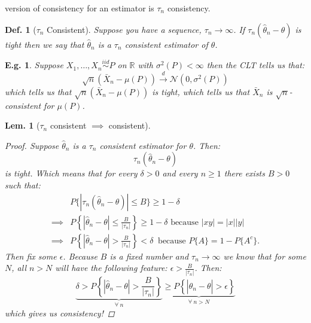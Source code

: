 \documentclass{tufte-book}
\theoremstyle{mytheoremstyle}
\theoremstyle{mylemstyle}
\newtheorem*{lem}{Lem.}
\theoremstyle{mydefstyle}
\newtheorem*{mydef}{Def.}
\newtheorem*{ex}{E.g.}
\begin{document}
 version of consistency for an estimator is \(\tau_n\) consistency.
\begin{mydef}[\(\tau_n\) Consistent] Suppose you have a sequence, \(\tau_n \rightarrow \infty\). If \(\tau_n(\hat{\theta}_n - \theta)\) is tight then we say that \(\hat{\theta}_n\) is a \(\tau_n\) consistent estimator of \(\theta\). 
\end{mydef}

\begin{ex} Suppose \(X_1, \dots, X_n \overset{iid}{\sim} P\) on \(\mathbb{R}\) with \(\sigma^2(P) < \infty\) then the CLT tells us that:
	\[\sqrt{n} (\bar{X}_n - \mu(P)) \overset{d}{\rightarrow} \mathcal{N}(0, \sigma^2(P))\]
which tells us that \(\sqrt{n} (\bar{X}_n - \mu(P)) \) is tight, which tells us that \(\bar{X}_n\) is \(\sqrt{n}\)-consistent for \(\mu(P)\). 
\end{ex}

\begin{lem}[\(\tau_n\) consistent \(\implies\) consistent] 
\begin{proof}Suppose \(\hat{\theta}_n\) is a \(\tau_n\) consistent estimator for \(\theta\). Then:
	\[\tau_n(\hat{\theta}_n - \theta)\]
is tight. Which means that for every \(\delta > 0\) and every \(n \ge 1\) there exists \(B > 0\) such that:
	\begin{align*}
		& P\{|\tau_n(\hat{\theta}_n - \theta)| \le B\} \ge 1- \delta \\
		\implies & P\left\{|\hat{\theta}_n - \theta| \le \frac{B}{|\tau_n|}\right\} \ge 1- \delta \text{ because \(|xy| = |x||y|\)} \\
		\implies & P\left\{|\hat{\theta}_n - \theta| > \frac{B}{|\tau_n|}\right\} < \delta\ \text{ because \(P\{A\} = 1 - P\{A^c\}\).}
	\end{align*}
Then fix some \(\epsilon\). Because \(B\) is a fixed number and \(\tau_n \rightarrow \infty\) we know that for some \(N\), all \(n > N\) will have the following feature: \(\epsilon > \frac{B}{|\tau_n|}\). Then:
	\[\underbrace{\delta > P\left\{|\hat{\theta}_n - \theta| > \frac{B}{|\tau_n|}\right\}}_\textrm{\(\forall\ n\)} \underbrace{\ge P\left\{|\hat{\theta}_n - \theta| > \epsilon \right\}}_\textrm{\(\forall\ n>N\)} \]
which gives us consistency!
\end{proof}
\end{lem}
\end{document}
